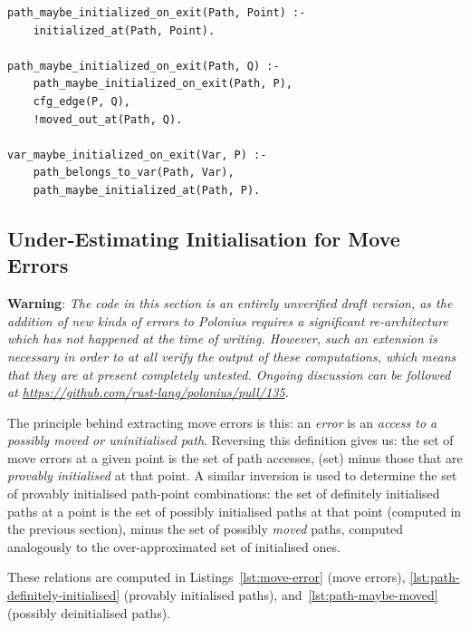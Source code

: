 \documentclass[11pt,a4paper,twoside,openany]{report}
\newenvironment{sourcecode}{\captionsetup{type=listing}}{}
\begin{document}
\begin{sourcecode}
  \label{lst:var-initialised}
\begin{verbatim}
path_maybe_initialized_on_exit(Path, Point) :- 
    initialized_at(Path, Point).

path_maybe_initialized_on_exit(Path, Q) :-
    path_maybe_initialized_on_exit(Path, P),
    cfg_edge(P, Q),
    !moved_out_at(Path, Q).

var_maybe_initialized_on_exit(Var, P) :-
    path_belongs_to_var(Path, Var),
    path_maybe_initialized_at(Path, P).
\end{verbatim}
\end{sourcecode}

\subsection{Under-Estimating Initialisation for Move
  Errors}\label{sec:move-errors}
\textbf{Warning}: \textit{The code in this section is an entirely unverified
  draft version, as the addition of new kinds of errors to Polonius requires a
  significant re-architecture which has not happened at the time of writing.
  However, such an extension is necessary in order to at all verify the output
  of these computations, which means that they are at present completely
  untested. Ongoing discussion can be followed at
  \url{https://github.com/rust-lang/polonius/pull/135}.}

The principle behind extracting move errors is this: an \textit{error} is an
\textit{access to a possibly moved or uninitialised path}. Reversing this
definition gives us: the set of move errors at a given point is the set of path
accesses, (set) minus those that are \textit{provably initialised} at that
point. A similar inversion is used to determine the set of provably initialised
path-point combinations: the set of definitely initialised paths at a point is
the set of possibly initialised paths at that point (computed in the previous
section), minus the set of possibly \textit{moved} paths, computed analogously
to the over-approximated set of initialised ones.

These relations are computed in Listings~\ref{lst:move-error} (move errors),
\ref{lst:path-definitely-initialised} (provably initialised paths),
and~\ref{lst:path-maybe-moved} (possibly deinitialised paths).
\end{document}
